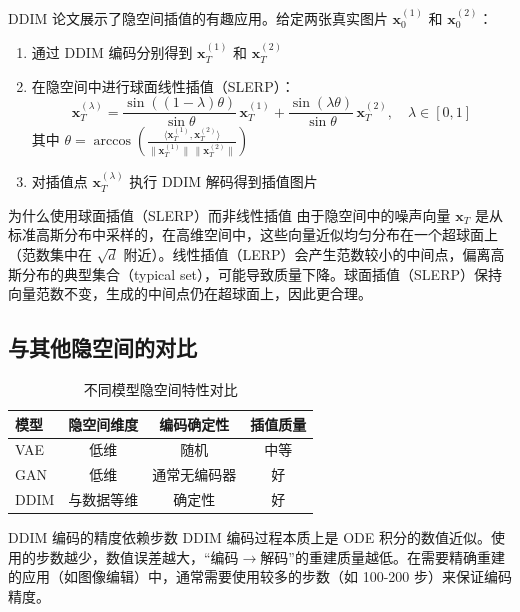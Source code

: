 \documentclass[a4paper]{article}
\begin{document}
DDIM 论文展示了隐空间插值的有趣应用。给定两张真实图片 $\mathbf{x}_0^{(1)}$ 和 $\mathbf{x}_0^{(2)}$：

\begin{enumerate}
    \item 通过 DDIM 编码分别得到 $\mathbf{x}_T^{(1)}$ 和 $\mathbf{x}_T^{(2)}$
    \item 在隐空间中进行球面线性插值（SLERP）：
    $$
    \mathbf{x}_T^{(\lambda)} = \frac{\sin((1-\lambda)\theta)}{\sin\theta}\,\mathbf{x}_T^{(1)} + \frac{\sin(\lambda\theta)}{\sin\theta}\,\mathbf{x}_T^{(2)}, \quad \lambda \in [0, 1]
    $$
    其中 $\theta = \arccos\left(\frac{\langle\mathbf{x}_T^{(1)}, \mathbf{x}_T^{(2)}\rangle}{\|\mathbf{x}_T^{(1)}\|\,\|\mathbf{x}_T^{(2)}\|}\right)$
    \item 对插值点 $\mathbf{x}_T^{(\lambda)}$ 执行 DDIM 解码得到插值图片
\end{enumerate}

\begin{knowledgebox}{为什么使用球面插值（SLERP）而非线性插值}
由于隐空间中的噪声向量 $\mathbf{x}_T$ 是从标准高斯分布中采样的，在高维空间中，这些向量近似均匀分布在一个超球面上（范数集中在 $\sqrt{d}$ 附近）。线性插值（LERP）会产生范数较小的中间点，偏离高斯分布的典型集合（typical set），可能导致质量下降。球面插值（SLERP）保持向量范数不变，生成的中间点仍在超球面上，因此更合理。
\end{knowledgebox}

\subsection{与其他隐空间的对比}

\begin{table}[H]
\centering
\caption{不同模型隐空间特性对比}
\begin{tabular}{lccc}
\toprule
\textbf{模型} & \textbf{隐空间维度} & \textbf{编码确定性} & \textbf{插值质量} \\
\midrule
VAE & 低维 & 随机 & 中等 \\
GAN & 低维 & 通常无编码器 & 好 \\
DDIM & 与数据等维 & 确定性 & 好 \\
\bottomrule
\end{tabular}
\end{table}

\begin{warningbox}{DDIM 编码的精度依赖步数}
DDIM 编码过程本质上是 ODE 积分的数值近似。使用的步数越少，数值误差越大，``编码$\to$解码''的重建质量越低。在需要精确重建的应用（如图像编辑）中，通常需要使用较多的步数（如 100-200 步）来保证编码精度。
\end{warningbox}
\end{document}
